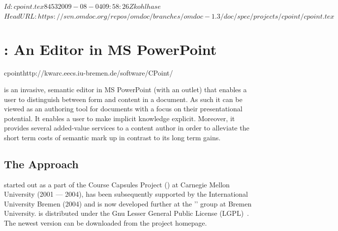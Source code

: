 \svnInfo $Id: cpoint.tex 8453 2009-08-04 09:58:26Z kohlhase $
\svnKeyword $HeadURL: https://svn.omdoc.org/repos/omdoc/branches/omdoc-1.3/doc/spec/projects/cpoint/cpoint.tex $

\section[CPoint]{{\cpoint}: An {\omdoc} Editor in MS PowerPoint}
\def\cpauthor{\scsys{CPointAuthor}}
\def\cpstudent{\scsys{CPointStudent}}
\def\cpbasic{\scsys{CPointBasic}}
\def\cpgraphs{\scsys{CPointGraphs}}
\def\cpimport{\scsys{CPointImport}}
\def\cpnotes{\scsys{CPointNotes}}
\def\texpoint{\scsys{TexPoint}}

\begin{project}{cpoint}{http://kwarc.eecs.iu-bremen.de/software/CPoint/}
\end{project}

{\cpoint} is an invasive, semantic {\omdoc} editor in MS PowerPoint (with an {\omdoc}
outlet) that enables a user to distinguish between form and content in a document. As such
it can be viewed as an authoring tool for {\omdoc} documents with a focus on their
presentational potential. It enables a user to make implicit knowledge explicit. Moreover,
it provides several added-value services to a content author in order to alleviate the
short term costs of semantic mark up in contrast to its long term gains.

\subsection{The {\cpoint} Approach}\label{sec:background}
{\cpoint} started out as a part of the Course Capsules Project
({\ccaps}) at Carnegie Mellon University (2001 --- 2004), has been subsequently supported by the
International University Bremen (2004) and is now developed further at the '{}' group at Bremen University. {\cpoint} is distributed under
the Gnu Lesser General Public License (LGPL)~\cite{LGPL}.  The newest version can be
downloaded from the project homepage.

